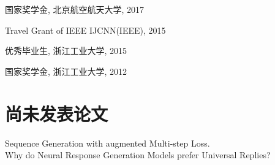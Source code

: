 \documentclass[margin,line]{resume}
\begin{document}
\begin{resume}
国家奖学金, 北京航空航天大学, 2017

Travel Grant of IEEE IJCNN(IEEE), 2015

优秀毕业生, 浙江工业大学, 2015
%

国家奖学金, 浙江工业大学, 2012



\section{尚未发表论文}
Sequence Generation with augmented Multi-step Loss. \\
Why do Neural Response Generation Models prefer Universal Replies? 

\end{resume}
\end{document}
